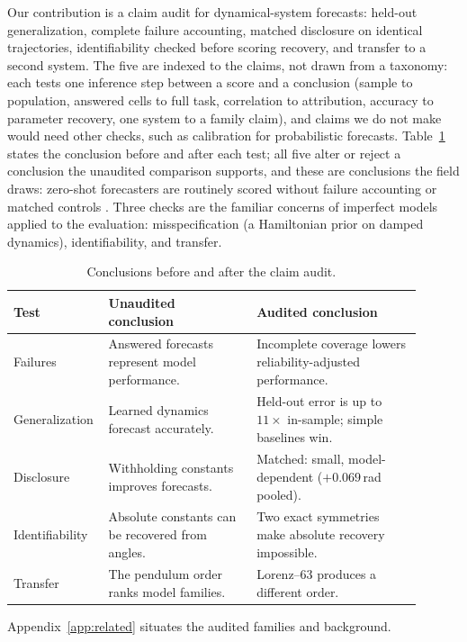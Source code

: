 \documentclass{article}
\begin{document}
Our contribution is a claim audit for dynamical-system forecasts: held-out generalization,
complete failure accounting, matched disclosure on identical trajectories, identifiability
checked before scoring recovery, and transfer to a second system. The five are indexed to
the claims, not drawn from a taxonomy: each tests one inference step between a score and a
conclusion (sample to population, answered cells to full task, correlation to attribution,
accuracy to parameter recovery, one system to a family claim), and claims we do not make
would need other checks, such as calibration for probabilistic forecasts.
Table~\ref{tab:audit-summary} states the conclusion before and after each test; all five
alter or reject a conclusion the unaudited comparison supports, and these are conclusions
the field draws: zero-shot forecasters are routinely scored without failure accounting or
matched controls \citep{gruver2023llmtime,zhang2025zeroshotchaos}. Three checks are
the familiar concerns of imperfect models applied to the evaluation: misspecification
(a Hamiltonian prior on damped dynamics), identifiability, and transfer.

\begin{table}[tbp]
\centering\footnotesize\renewcommand{\arraystretch}{0.90}
\caption{Conclusions before and after the claim audit.}
\label{tab:audit-summary}
\begin{tabular}{p{0.16\linewidth}p{0.35\linewidth}p{0.39\linewidth}}
\toprule
Test & Unaudited conclusion & Audited conclusion \\
\midrule
Failures &
Answered forecasts represent model performance. &
Incomplete coverage lowers reliability-adjusted performance. \\
Generalization &
Learned dynamics forecast accurately. &
Held-out error is up to $11\times$ in-sample; simple baselines win. \\
Disclosure &
Withholding constants improves forecasts. &
Matched: small, model-dependent ($+0.069$\,rad pooled). \\
Identifiability &
Absolute constants can be recovered from angles. &
Two exact symmetries make absolute recovery impossible. \\
Transfer &
The pendulum order ranks model families. &
Lorenz--63 produces a different order. \\
\bottomrule
\end{tabular}
\end{table}

Appendix~\ref{app:related} situates the audited families and background.
\end{document}
